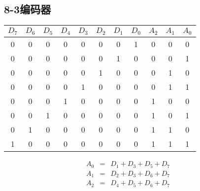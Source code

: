 \documentclass[10pt]{book}
\begin{document}
\subsection{8-3编码器}
\begin{tabular}{|c|c|c|c|c|c|c|c||c|c|c|}
\hline
$D_{7}$ & $D_{6}$ & $D_{5}$ & $D_{4}$ & $D_{3}$ & $D_{2}$ & $D_{1}$ & $D_{0}$ & $A_{2}$ & $A_{1}$ & $A_{0}$ \\
\hline
0 & 0 & 0 & 0 & 0 & 0 & 0 & 1 & 0 & 0 & 0 \\
0 & 0 & 0 & 0 & 0 & 0 & 1 & 0 & 0 & 0 & 1 \\
0 & 0 & 0 & 0 & 0 & 1 & 0 & 0 & 0 & 1 & 0 \\
0 & 0 & 0 & 0 & 1 & 0 & 0 & 0 & 0 & 1 & 1 \\
0 & 0 & 0 & 1 & 0 & 0 & 0 & 0 & 1 & 0 & 0 \\
0 & 0 & 1 & 0 & 0 & 0 & 0 & 0 & 1 & 0 & 1 \\
0 & 1 & 0 & 0 & 0 & 0 & 0 & 0 & 1 & 1 & 0 \\
1 & 0 & 0 & 0 & 0 & 0 & 0 & 0 & 1 & 1 & 1 \\
\hline
\end{tabular}

\begin{eqnarray}
A_{0} &=& D_{1}+D_{3}+D_{5}+D_{7} \\
A_{1} &=& D_{2}+D_{3}+D_{6}+D_{7} \\
A_{2} &=& D_{4}+D_{5}+D_{6}+D_{7}
\end{eqnarray}
\end{document}

